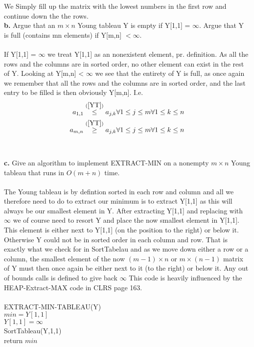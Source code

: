 \documentclass{article}
\theoremstyle{remark}
\numberwithin{equation}{section}
\begin{document}
\noindent We Simply fill up the matrix with the lowest numbers in the first row and continue down the the rows. 
\\
\textbf{b.} Argue that an $m \times n$ Young tableau Y is empty if Y[1,1] = $\infty$. Argue that Y is full (contains mn elements) if Y[m,n] $<\infty$. 
\\
\\
If Y[1,1] = $\infty$ we treat Y[1,1] as an nonexistent element, pr. definition. As all the rows and the columns are in sorted order, no other element can exist in the rest of Y. Looking at Y[m,n] < $\infty$ we see that the entirety of Y is full, as once again we remember that all the rows and the columns are in sorted order, and the last entry to be filled is then obviously Y[m,n]. I.e.
\begin{align*}
	 a_{1,1} \stackrel{(\ref{YT})}{\leq} a_{j,k} \forall 1\leq j \leq m \forall 1 \leq k \leq n \\
	a_{m,n} \stackrel{(\ref{YT})}{\geq} a_{j,k} \forall 1\leq j \leq m \forall 1 \leq k \leq n
\end{align*}
\\
\\
\textbf{c.} Give an algorithm to implement EXTRACT-MIN on a nonempty $m\times n$ Young tableau that runs in $O(m+n)$ time.\\
\\The Young tableau is by defintion sorted in each row and column and all we therefore need to do to extract our minimum is to extract Y[1,1] as this will always be our smallest element in Y. After extracting Y[1,1] and replacing with $\infty$ we of course need to resort Y and place the now smallest element in Y[1,1]. This element is either next to Y[1,1] (on the position to the right) or below it. Otherwise Y could not be in sorted order in each column and row. That is exactly what we check for in SortTabelau and as we move down either a row or a column, the smallest element of the now $(m-1 )\times n$ or $m \times (n-1)$ matrix of Y must then once again be either next to it (to the right) or below it. Any out of bounds calls is defined to give back $\infty $
This code is heavily influenced by the HEAP-Extract-MAX code in CLRS page 163.
\\
\\\noindent EXTRACT-MIN-TABLEAU(Y)\\
$min=Y[1,1]$\\
$Y[1,1]=\infty$\\
SortTableau(Y,1,1)\\
return $min$\\
\end{document}
